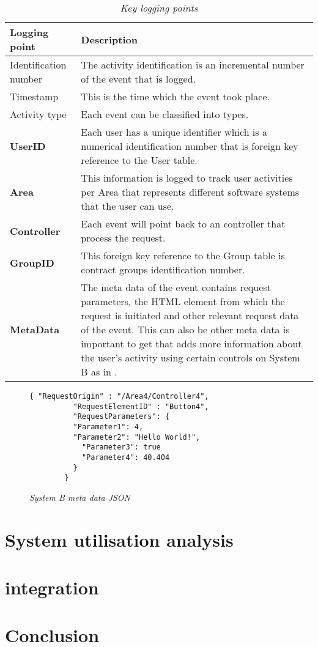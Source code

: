 \begin{table}[!htb]
	\centering
	\small
	\caption[Key logging points]
	{\textit{Key logging points}}
	\label{tbl:Ch2_KeyLogging_Points}
	\begin{tabularx}{\textwidth}{|l|X|}
		\hline \textbf{Logging point} & \textbf{Description} \\
		\hline Identification number & The activity identification is an incremental number of the event that is logged.\\
		\hline Timestamp & This is the time which the event took place.\\
		\hline Activity type & Each event can be classified into types. \\
		\hline \textbf{UserID} & Each user has a unique identifier which is a numerical identification number that is foreign key reference to the User table. \\
		\hline \textbf{Area} & This information is logged to track user activities per Area that represents different software systems that the user can use. \\
		\hline \textbf{Controller} & Each event will point back to an controller that process the request. \\
		\hline \textbf{GroupID} & This foreign key reference to the Group table is contract groups identification number. \\
		\hline \textbf{MetaData} & The meta data of the event contains request parameters, the HTML element from which the request is initiated and other relevant request data of the event. This can also be other meta data is important to get that adds more information about the user's activity using certain controls on System B as in \Cref{fig:CH2_SystemBMetaData}. \\
		\hline
	\end{tabularx}
\end{table}

\begin{figure}[!htb]
	\centering
	\begin{lstlisting}[style=json] 
		{ "RequestOrigin" : "/Area4/Controller4",
		  "RequestElementID" : "Button4",
		  "RequestParameters": {
		  "Parameter1": 4,
		  "Parameter2": "Hello World!",
			"Parameter3": true
			"Parameter4": 40.404
		  }		
		}
	\end{lstlisting}
	\caption[System B meta data JSON]
	{\textit{System B meta data JSON}}\label{fig:Ch2_Metadata_Json_Example}
\end{figure}

\section{System utilisation analysis}

\section{integration}

\section{Conclusion}